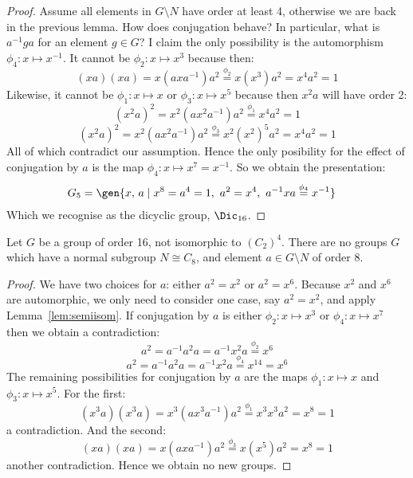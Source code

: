 \begin{proof}
    Assume all elements in \(G\setminus N\) have order at least 4, otherwise we are back in the previous lemma.
    How does conjugation behave?
    In particular, what is \(a^{-1}ga\) for an element \(g \in G\)?
    I claim the only possibility is the automorphism \(\phi_4:x\mapsto x^{-1}\).
    It cannot be \(\phi_2:x\mapsto x^3\) because then:
    \[(xa)(xa) = x(axa^{-1})a^2 \overset{\phi_2}{=} x(x^3) a^2 = x^4 a^2 = 1\]
    Likewise, it cannot be \(\phi_1:x\mapsto x\) or \(\phi_3:x\mapsto x^5\) because then \(x^2 a\) will have order 2:
    \[{(x^2 a)}^2 = x^2 (ax^2 a^{-1})a^2 \overset{\phi_1}{=} x^4 a^2 = 1\]
    \[{(x^2 a)}^2 = x^2 (ax^2 a^{-1})a^2 \overset{\phi_3}{=} x^2 {(x^2)}^5 a^2 = x^4 a^2 = 1\]
    All of which contradict our assumption.
    Hence the only posibility for the effect of conjugation by \(a\) is the map \(\phi_4:x\mapsto x^7 = x^{-1}\).
    So we obtain the presentation:
    \begin{align*}
        G_5 &= \gen{x,\,a \mid x^8 = a^4 = 1,\ a^2 = x^4,\ a^{-1}xa \overset{\phi_4}{=} x^{-1}}
    \end{align*}
    Which we recognise as the dicyclic group, \(\Dic_{16}\).
\end{proof}

\begin{lemma}
    Let \(G\) be a group of order 16, not isomorphic to \({(C_{2})}^4\).
    There are no groups \(G\) which have a normal subgroup \(N \cong C_8\), and element \(a \in G\setminus N\) of order 8.
\end{lemma}

\begin{proof}
    We have two choices for \(a\): either \(a^2 = x^2\) or \(a^2 = x^6\).
    Because \(x^2\) and \(x^6\) are automorphic, we only need to consider one case, say \(a^2 = x^2\), and apply
    Lemma~\ref{lem:semiisom}.
    If conjugation by \(a\) is either \(\phi_2:x\mapsto x^3\) or \(\phi_4:x\mapsto x^7\) then we obtain a
    contradiction:
    \[a^2 = a^{-1}a^2 a = a^{-1}x^2 a \overset{\phi_2}{=} x^6\]
    \[a^2 = a^{-1}a^2 a = a^{-1}x^2 a \overset{\phi_4}{=} x^{14} = x^6\]
    The remaining possibilities for conjugation by \(a\) are the maps \(\phi_1:x\mapsto x\) and \(\phi_3:x \mapsto
    x^5\).
    For the first:
    \[(x^3 a)(x^3 a) = x^3(ax^3 a^{-1})a^2 \overset{\phi_1}{=} x^3 x^3 a^2 = x^8 = 1\]
    a contradiction.
    And the second:
    \[(xa)(xa) = x(axa^{-1})a^2 \overset{\phi_3}{=} x(x^5)a^2 = x^8 = 1\]
    another contradiction.
    Hence we obtain no new groups.
\end{proof}

